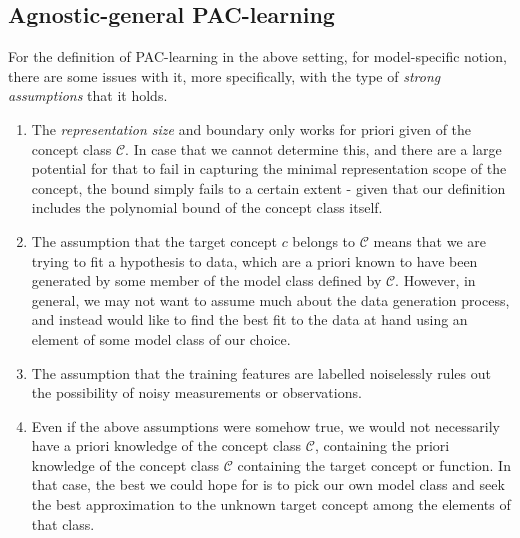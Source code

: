 \subsection{Agnostic-general PAC-learning}

For the definition of PAC-learning in the above setting, for model-specific notion, there are some issues with it, more specifically, with the type of \textit{strong assumptions} that it holds. 
\begin{enumerate}[noitemsep,topsep=1pt]
    \item The \textit{representation size} and boundary only works for priori given of the concept class $\mathcal{C}$. In case that we cannot determine this, and there are a large potential for that to fail in capturing the minimal representation scope of the concept, the bound simply fails to a certain extent - given that our definition includes the polynomial bound of the concept class itself. 
    \item The assumption that the target concept $c$ belongs to $\mathcal{C}$ means that we are trying to fit a hypothesis to data, which are a priori known to have been generated by some member of the model class defined by $\mathcal{C}$. However, in general, we may not want to assume much about the data generation process, and instead would like to find the best fit to the data at hand using an element of some model class of our choice. 
    \item The assumption that the training features are labelled noiselessly rules out the possibility of noisy measurements or observations. 
    \item Even if the above assumptions were somehow true, we would not necessarily have a priori knowledge of the concept class $\mathcal{C}$, containing the priori knowledge of the concept class $\mathcal{C}$ containing the target concept or function. In that case, the best we could hope for is to pick our own model class and seek the best approximation to the unknown target concept among the elements of that class. 
\end{enumerate}

